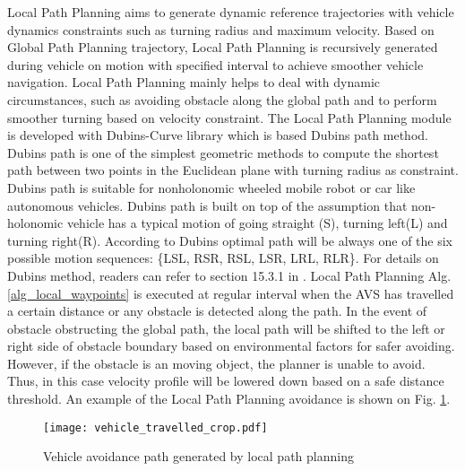 \documentclass[10 pt,a4paper,conference]{IEEEtran}
\begin{document}
Local Path Planning aims to generate dynamic reference trajectories with
vehicle dynamics constraints such as turning radius and maximum
velocity. Based on Global Path Planning trajectory, Local Path Planning
is recursively generated during vehicle on motion with specified
interval to achieve smoother vehicle navigation. Local Path Planning
mainly helps to deal with dynamic circumstances, such as avoiding
obstacle along the global path and to perform smoother turning based on
velocity constraint. The Local Path Planning module is developed with
Dubins-Curve \citep{DubinsCurves} library which is based Dubins
\citep{dubinscurve1957} path method. Dubins path is one of the simplest
geometric methods to compute the shortest path between two points in the
Euclidean plane with turning radius as constraint. Dubins path is
suitable for nonholonomic wheeled mobile robot or car like autonomous
vehicles. Dubins path is built on top of the assumption that
non-holonomic vehicle has a typical motion of going straight (S),
turning left(L) and turning right(R). According to Dubins
\citep{dubinscurve1957} optimal path will be always one of the six
possible motion sequences: \{LSL, RSR, RSL, LSR, LRL, RLR\}. For details
on Dubins method, readers can refer to section 15.3.1 in
\citep{lavalle2006planning}. Local Path Planning Alg.
\ref{alg_local_waypoints} is executed at regular interval when the AVS
has travelled a certain distance or any obstacle is detected along the
path. In the event of obstacle obstructing the global path, the local
path will be shifted to the left or right side of obstacle boundary
based on environmental factors for safer avoiding. However, if the
obstacle is an moving object, the planner is unable to avoid. Thus, in
this case velocity profile will be lowered down based on a safe distance
threshold. An example of the Local Path Planning avoidance is shown on
Fig. \ref{veh_avoid_close}.

\begin{figure}[!t]
\centering
\texttt{[image: vehicle\_travelled\_crop.pdf]}
\caption{Vehicle avoidance path generated by local path planning}
\label{veh_avoid_close}
\end{figure}
\end{document}
